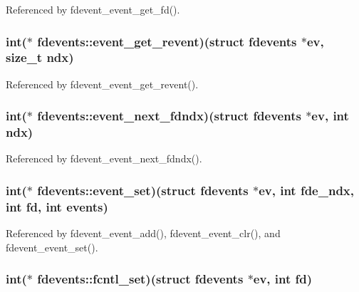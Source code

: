 Referenced by fdevent\-\_\-event\-\_\-get\-\_\-fd().

\hypertarget{structfdevents_a88f6a7540f1fc6703a21bc02db3ff261}{
\subsubsection[{event\-\_\-get\-\_\-revent}]{\setlength{\rightskip}{0pt plus 5cm}int($\ast$ fdevents\-::event\-\_\-get\-\_\-revent)(struct {\bf fdevents} $\ast$ev, size\-\_\-t ndx)}}\label{structfdevents_a88f6a7540f1fc6703a21bc02db3ff261}


Referenced by fdevent\-\_\-event\-\_\-get\-\_\-revent().

\hypertarget{structfdevents_a380325469736e86b71706677c4b58797}{
\subsubsection[{event\-\_\-next\-\_\-fdndx}]{\setlength{\rightskip}{0pt plus 5cm}int($\ast$ fdevents\-::event\-\_\-next\-\_\-fdndx)(struct {\bf fdevents} $\ast$ev, int ndx)}}\label{structfdevents_a380325469736e86b71706677c4b58797}


Referenced by fdevent\-\_\-event\-\_\-next\-\_\-fdndx().

\hypertarget{structfdevents_ad23c2b0f981da7d7efd43c48bf65d4d6}{
\subsubsection[{event\-\_\-set}]{\setlength{\rightskip}{0pt plus 5cm}int($\ast$ fdevents\-::event\-\_\-set)(struct {\bf fdevents} $\ast$ev, int fde\-\_\-ndx, int fd, int events)}}\label{structfdevents_ad23c2b0f981da7d7efd43c48bf65d4d6}


Referenced by fdevent\-\_\-event\-\_\-add(), fdevent\-\_\-event\-\_\-clr(), and fdevent\-\_\-event\-\_\-set().

\hypertarget{structfdevents_a8f9881ac88d76f35a2160903c1a839ad}{
\subsubsection[{fcntl\-\_\-set}]{\setlength{\rightskip}{0pt plus 5cm}int($\ast$ fdevents\-::fcntl\-\_\-set)(struct {\bf fdevents} $\ast$ev, int fd)}}\label{structfdevents_a8f9881ac88d76f35a2160903c1a839ad}


